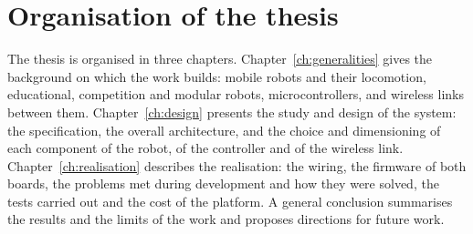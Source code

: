 \section*{Organisation of the thesis}
The thesis is organised in three chapters. Chapter~\ref{ch:generalities} gives the
background on which the work builds: mobile robots and their locomotion, educational,
competition and modular robots, microcontrollers, and wireless links between them.
Chapter~\ref{ch:design} presents the study and design of the system: the specification,
the overall architecture, and the choice and dimensioning of each component of the robot,
of the controller and of the wireless link. Chapter~\ref{ch:realisation} describes the
realisation: the wiring, the firmware of both boards, the problems met during development
and how they were solved, the tests carried out and the cost of the platform. A general
conclusion summarises the results and the limits of the work and proposes directions for
future work.
